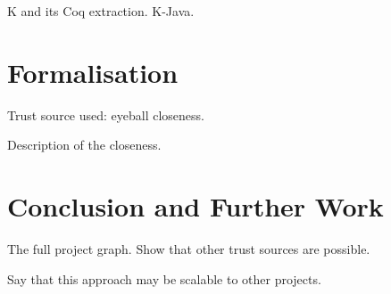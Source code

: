 \documentclass[9pt, sigplan, natbib=false]{acmart}
\newcommand\Coq{Coq}
\begin{document}
K and its \Coq{} extraction.
K-Java.

\section{Formalisation}

Trust source used: eyeball closeness.

Description of the closeness.

\section{Conclusion and Further Work}

The full project graph.
Show that other trust sources are possible.

Say that this approach may be scalable to other projects.

\printbibliography
\end{document}
